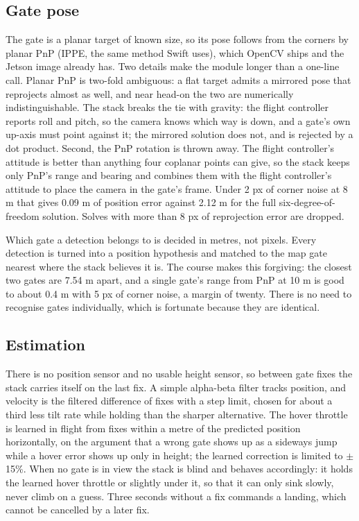 \documentclass{article}
\begin{document}
\subsection{Gate pose}
The gate is a planar target of known size, so its pose follows from the corners by planar PnP (IPPE, the same method Swift uses), which OpenCV ships and the Jetson image already has. Two details make the module longer than a one-line call. Planar PnP is two-fold ambiguous: a flat target admits a mirrored pose that reprojects almost as well, and near head-on the two are numerically indistinguishable. The stack breaks the tie with gravity: the flight controller reports roll and pitch, so the camera knows which way is down, and a gate's own up-axis must point against it; the mirrored solution does not, and is rejected by a dot product. Second, the PnP rotation is thrown away. The flight controller's attitude is better than anything four coplanar points can give, so the stack keeps only PnP's range and bearing and combines them with the flight controller's attitude to place the camera in the gate's frame. Under 2 px of corner noise at 8 m that gives 0.09 m of position error against 2.12 m for the full six-degree-of-freedom solution. Solves with more than 8 px of reprojection error are dropped.

Which gate a detection belongs to is decided in metres, not pixels. Every detection is turned into a position hypothesis and matched to the map gate nearest where the stack believes it is. The course makes this forgiving: the closest two gates are 7.54 m apart, and a single gate's range from PnP at 10 m is good to about 0.4 m with 5 px of corner noise, a margin of twenty. There is no need to recognise gates individually, which is fortunate because they are identical.

\subsection{Estimation}
There is no position sensor and no usable height sensor, so between gate fixes the stack carries itself on the last fix. A simple alpha-beta filter tracks position, and velocity is the filtered difference of fixes with a step limit, chosen for about a third less tilt rate while holding than the sharper alternative. The hover throttle is learned in flight from fixes within a metre of the predicted position horizontally, on the argument that a wrong gate shows up as a sideways jump while a hover error shows up only in height; the learned correction is limited to $\pm$15\%. When no gate is in view the stack is blind and behaves accordingly: it holds the learned hover throttle or slightly under it, so that it can only sink slowly, never climb on a guess. Three seconds without a fix commands a landing, which cannot be cancelled by a later fix.
\end{document}
